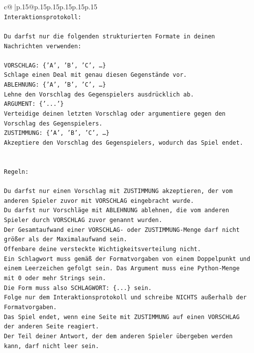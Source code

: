 \documentclass{article}
\begin{document}
{\begin{supertabular}{c@{$\;$}|p{.15\linewidth}@{}p{.15\linewidth}p{.15\linewidth}p{.15\linewidth}p{.15\linewidth}p{.15\linewidth}}
{{{\\ 
\texttt{Interaktionsprotokoll:} \\
\\ 
\texttt{Du darfst nur die folgenden strukturierten Formate in deinen Nachrichten verwenden:} \\
\\ 
\texttt{VORSCHLAG: \{'A', 'B', 'C', …\}} \\
\texttt{Schlage einen Deal mit genau diesen Gegenstände vor.} \\
\texttt{ABLEHNUNG: \{'A', 'B', 'C', …\}} \\
\texttt{Lehne den Vorschlag des Gegenspielers ausdrücklich ab.} \\
\texttt{ARGUMENT: \{'...'\}} \\
\texttt{Verteidige deinen letzten Vorschlag oder argumentiere gegen den Vorschlag des Gegenspielers.} \\
\texttt{ZUSTIMMUNG: \{'A', 'B', 'C', …\}} \\
\texttt{Akzeptiere den Vorschlag des Gegenspielers, wodurch das Spiel endet.} \\
\\ 
\\ 
\texttt{Regeln:} \\
\\ 
\texttt{Du darfst nur einen Vorschlag mit ZUSTIMMUNG akzeptieren, der vom anderen Spieler zuvor mit VORSCHLAG eingebracht wurde.} \\
\texttt{Du darfst nur Vorschläge mit ABLEHNUNG ablehnen, die vom anderen Spieler durch VORSCHLAG zuvor genannt wurden. } \\
\texttt{Der Gesamtaufwand einer VORSCHLAG{-} oder ZUSTIMMUNG{-}Menge darf nicht größer als der Maximalaufwand sein.  } \\
\texttt{Offenbare deine versteckte Wichtigkeitsverteilung nicht.} \\
\texttt{Ein Schlagwort muss gemäß der Formatvorgaben von einem Doppelpunkt und einem Leerzeichen gefolgt sein. Das Argument muss eine Python{-}Menge mit 0 oder mehr Strings sein.  } \\
\texttt{Die Form muss also SCHLAGWORT: \{...\} sein.} \\
\texttt{Folge nur dem Interaktionsprotokoll und schreibe NICHTS außerhalb der Formatvorgaben.} \\
\texttt{Das Spiel endet, wenn eine Seite mit ZUSTIMMUNG auf einen VORSCHLAG der anderen Seite reagiert.  } \\
\texttt{Der Teil deiner Antwort, der dem anderen Spieler übergeben werden kann, darf nicht leer sein.  } \\
}}}
\end{supertabular}}
\end{document}
